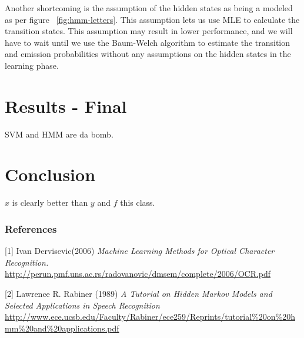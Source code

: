 \documentclass{article} %
\begin{document}
Another shortcoming is the assumption of the hidden states as being a modeled as per figure ~\ref{fig:hmm-letters}. This assumption lets us use MLE to calculate the transition states. This assumption may result in lower performance, and we will have to wait until we use the Baum-Welch algorithm to estimate the transition and emission probabilities without any assumptions on the hidden states in the learning phase.

\section{Results - Final}

SVM and HMM are da bomb.

\section{Conclusion}

$x$ is clearly better than $y$ and $f$ this class.

\subsubsection*{References}

\small{
[1] Ivan Dervisevic(2006) {\it Machine Learning Methods for Optical Character Recognition.} \url{http://perun.pmf.uns.ac.rs/radovanovic/dmsem/complete/2006/OCR.pdf}

[2] Lawrence R. Rabiner (1989) {\it A Tutorial on Hidden Markov Models and Selected Applications in Speech Recognition} \url{http://www.ece.ucsb.edu/Faculty/Rabiner/ece259/Reprints/tutorial\%20on\%20hmm\%20and\%20applications.pdf}
}
\end{document}
